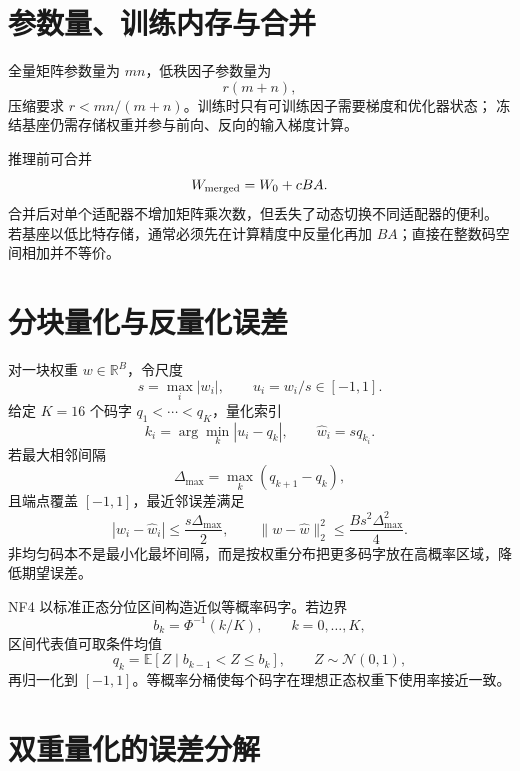 \documentclass[11pt]{article}
\numberwithin{equation}{section}
\newcommand{\R}{\mathbb{R}}
\newcommand{\E}{\mathbb{E}}
\newcommand{\1}{\mathbf{1}}
\newcommand{\cN}{\mathcal{N}}
\begin{document}
\section{参数量、训练内存与合并}

全量矩阵参数量为 $mn$，低秩因子参数量为
\begin{equation}
 r(m+n),
\end{equation}
压缩要求 $r<mn/(m+n)$。训练时只有可训练因子需要梯度和优化器状态；
冻结基座仍需存储权重并参与前向、反向的输入梯度计算。

推理前可合并
\begin{equation}
 W_{\rm merged}=W_0+cBA.
\end{equation}
合并后对单个适配器不增加矩阵乘次数，但丢失了动态切换不同适配器的便利。
若基座以低比特存储，通常必须先在计算精度中反量化再加 $BA$；直接在整数码空间相加并不等价。

\section{分块量化与反量化误差}

对一块权重 $w\in\R^B$，令尺度
\begin{equation}
 s=\max_i|w_i|,\qquad u_i=w_i/s\in[-1,1].
\end{equation}
给定 $K=16$ 个码字 $q_1<\cdots<q_K$，量化索引
\begin{equation}
 k_i=\arg\min_k|u_i-q_k|,\qquad
 \widehat w_i=sq_{k_i}.
\end{equation}
若最大相邻间隔
\begin{equation}
 \Delta_{\max}=\max_k(q_{k+1}-q_k),
\end{equation}
且端点覆盖 $[-1,1]$，最近邻误差满足
\begin{equation}
 |w_i-\widehat w_i|\le\frac{s\Delta_{\max}}2,
 \qquad
 \|w-\widehat w\|_2^2\le
 \frac{Bs^2\Delta_{\max}^2}{4}.
\end{equation}
非均匀码本不是最小化最坏间隔，而是按权重分布把更多码字放在高概率区域，降低期望误差。

NF4 以标准正态分位区间构造近似等概率码字。若边界
\begin{equation}
 b_k=\Phi^{-1}(k/K),\qquad k=0,\ldots,K,
\end{equation}
区间代表值可取条件均值
\begin{equation}
 q_k=\E[Z\mid b_{k-1}<Z\le b_k],\qquad Z\sim\cN(0,1),
\end{equation}
再归一化到 $[-1,1]$。等概率分桶使每个码字在理想正态权重下使用率接近一致。

\section{双重量化的误差分解}
\end{document}
